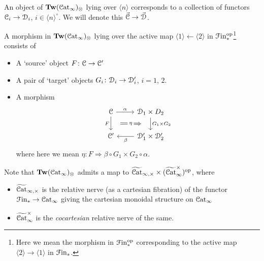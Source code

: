 \documentclass[main.tex]{subfiles}
\begin{document}
\begin{example}
  An object of $\mathbf{Tw}(\mathcal{C}\mathrm{at}_{\infty})_{\otimes}$ lying over $\langle n \rangle$ corresponds to a collection of functors $\mathcal{C}_{i} \to \mathcal{D}_{i}$, $i \in \langle n \rangle^{\circ}$. We will denote this $\vec{\mathcal{C}} \to \vec{\mathcal{D}}$.

  A morphism in $\mathbf{Tw}(\mathcal{C}\mathrm{at}_{\infty})_{\otimes}$ lying over the active map $\langle 1 \rangle \leftarrow \langle 2 \rangle$ in $\mathcal{F}\mathrm{in}_{*}^{\mathrm{op}}$\footnote{Here we mean the morphism in $\mathcal{F}\mathrm{in}_{*}^{\mathrm{op}}$ corresponding to the active map $\langle 2 \rangle \to \langle 1 \rangle$ in $\mathcal{F}\mathrm{in}_{*}$.} consists of
  \begin{itemize}
    \item A `source' object $F\colon \mathcal{C} \to \mathcal{C}'$

    \item A pair of `target' objects $G_{i}\colon \mathcal{D}_{i} \to \mathcal{D}'_{i}$, $i = 1$, $2$.

    \item A morphism
      \begin{equation*}
        \begin{tikzcd}
          \category{C}
          \arrow[r, "\alpha"]
          \arrow[d, ""{name=L, right}, "F"{left}]
          & \category{D}_{1} \times D_{2}
          \arrow[d, ""{name=R, left}, "G_{1} \times G_{2}"{right}]
          \\
          \category{C}'
          & \category{D}'_{1} \times \category{D}'_{2}
          \arrow[l, "\beta"]
          \arrow[Rightarrow, from=L, to=R, shorten=2ex, "\eta"{description}]
        \end{tikzcd}
      \end{equation*}
      where here we mean $\eta\colon F \Rightarrow \beta \circ G_{1} \times G_{2} \circ \alpha$.
  \end{itemize}
\end{example}

Note that $\mathbf{Tw}(\mathcal{C}\mathrm{at}_{\infty})_{\otimes}$ admits a map to $\widetilde{\mathcal{C}\mathrm{at}}_{\infty,\times} \times (\widetilde{\mathcal{C}\mathrm{at}}_{\infty}^{\times})^{\mathrm{op}}$, where
\begin{itemize}
  \item $\widetilde{\mathcal{C}\mathrm{at}}_{\infty,\times}$ is the relative nerve (as a cartesian fibration) of the functor $\mathcal{F}\mathrm{in}_{*} \to \mathcal{C}\mathrm{at}_{\infty}$ giving the cartesian monoidal structure on $\mathcal{C}\mathrm{at}_{\infty}$

  \item $\widetilde{\mathcal{C}\mathrm{at}}_{\infty}^{\times}$ is the \emph{cocartesian} relative nerve of the same.
\end{itemize}
\end{document}
